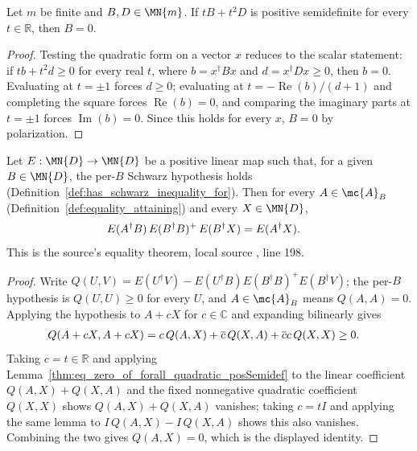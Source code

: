 \begin{theorem}
    \label{thm:eq_zero_of_forall_quadratic_posSemidef}
    \leanok
    Let $m$ be finite and $B,D\in\MN{m}$. If
    $tB+t^2D$ is positive semidefinite for every $t\in\mathbb R$, then
    $B=0$.
\end{theorem}

\begin{proof}\leanok
    Testing the quadratic form on a vector $x$ reduces to the scalar
    statement: if $tb+t^2d\ge0$ for every real $t$, where
    $b=x^\dagger Bx$ and $d=x^\dagger Dx\ge0$, then $b=0$. Evaluating at
    $t=\pm1$ forces $d\ge0$; evaluating at $t=-\operatorname{Re}(b)/(d+1)$
    and completing the square forces $\operatorname{Re}(b)=0$, and
    comparing the imaginary parts at $t=\pm1$ forces
    $\operatorname{Im}(b)=0$. Since this holds for every $x$, $B=0$ by
    polarization.
\end{proof}

\begin{theorem}
    \label{thm:two_variable_schwarz_equality}
    \leanok
    Let $E:\MN{D}\to\MN{D}$ be a positive linear map such that, for a
    given $B\in\MN{D}$, the per-$B$ Schwarz hypothesis holds
    (Definition~\ref{def:has_schwarz_inequality_for}). Then for every
    $A\in\mc{A}_B$ (Definition~\ref{def:equality_attaining}) and every
    $X\in\MN{D}$,
    \begin{align}
        E(A^\dagger B)\,E(B^\dagger B)^{+}\,E(B^\dagger X)
         & = E(A^\dagger X).
        \notag
    \end{align}
    This is the source's equality theorem, local source
    , line 198.
\end{theorem}

\begin{proof}\leanok
    Write $Q(U,V) = E(U^\dagger V) - E(U^\dagger B)E(B^\dagger B)^+E(B^\dagger
    V)$; the per-$B$ hypothesis is $Q(U,U)\ge0$ for every $U$, and
    $A\in\mc{A}_B$ means $Q(A,A)=0$. Applying the hypothesis to
    $A + cX$ for $c\in\mathbb C$ and expanding bilinearly gives
    \begin{align}
        Q(A+cX,A+cX)
         & = c\,Q(A,X) + \overline{c}\,Q(X,A) + \overline{c}c\,Q(X,X)
        \ge 0.
        \notag
    \end{align}
    Taking $c=t\in\mathbb R$ and applying
    Lemma~\ref{thm:eq_zero_of_forall_quadratic_posSemidef} to the linear
    coefficient $Q(A,X)+Q(X,A)$ and the fixed nonnegative quadratic
    coefficient $Q(X,X)$ shows $Q(A,X)+Q(X,A)$ vanishes; taking $c=tI$ and
    applying the same lemma to $I\,Q(A,X) - I\,Q(X,A)$ shows this also
    vanishes. Combining the two gives $Q(A,X)=0$, which is the displayed
    identity.
\end{proof}

